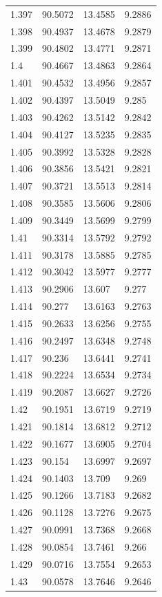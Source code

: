 \begin{tabular}{llll}
1.397 & 90.5072 & 13.4585 & 9.2886 \\
1.398 & 90.4937 & 13.4678 & 9.2879 \\
1.399 & 90.4802 & 13.4771 & 9.2871 \\
1.4 & 90.4667 & 13.4863 & 9.2864 \\
1.401 & 90.4532 & 13.4956 & 9.2857 \\
1.402 & 90.4397 & 13.5049 & 9.285 \\
1.403 & 90.4262 & 13.5142 & 9.2842 \\
1.404 & 90.4127 & 13.5235 & 9.2835 \\
1.405 & 90.3992 & 13.5328 & 9.2828 \\
1.406 & 90.3856 & 13.5421 & 9.2821 \\
1.407 & 90.3721 & 13.5513 & 9.2814 \\
1.408 & 90.3585 & 13.5606 & 9.2806 \\
1.409 & 90.3449 & 13.5699 & 9.2799 \\
1.41 & 90.3314 & 13.5792 & 9.2792 \\
1.411 & 90.3178 & 13.5885 & 9.2785 \\
1.412 & 90.3042 & 13.5977 & 9.2777 \\
1.413 & 90.2906 & 13.607 & 9.277 \\
1.414 & 90.277 & 13.6163 & 9.2763 \\
1.415 & 90.2633 & 13.6256 & 9.2755 \\
1.416 & 90.2497 & 13.6348 & 9.2748 \\
1.417 & 90.236 & 13.6441 & 9.2741 \\
1.418 & 90.2224 & 13.6534 & 9.2734 \\
1.419 & 90.2087 & 13.6627 & 9.2726 \\
1.42 & 90.1951 & 13.6719 & 9.2719 \\
1.421 & 90.1814 & 13.6812 & 9.2712 \\
1.422 & 90.1677 & 13.6905 & 9.2704 \\
1.423 & 90.154 & 13.6997 & 9.2697 \\
1.424 & 90.1403 & 13.709 & 9.269 \\
1.425 & 90.1266 & 13.7183 & 9.2682 \\
1.426 & 90.1128 & 13.7276 & 9.2675 \\
1.427 & 90.0991 & 13.7368 & 9.2668 \\
1.428 & 90.0854 & 13.7461 & 9.266 \\
1.429 & 90.0716 & 13.7554 & 9.2653 \\
1.43 & 90.0578 & 13.7646 & 9.2646 \\

\end{tabular}
